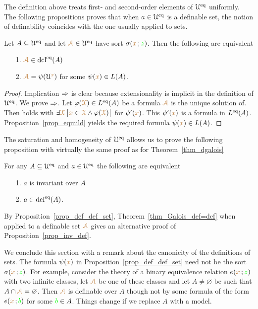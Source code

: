 The definition above treats first- and second-order elements of $\EuScript U^{{\rm eq}}$ uniformly.
The following propositions proves that when $a\in\EuScript U^{{\rm eq}}$ is a definable set, the notion of definability coincides with the one usually applied to sets.

\begin{proposition}\label{prop_def_def_set}
Let $A\subseteq\EuScript U^{{\rm eq}}$ and let ${\color{brown}\EuScript A}\in\EuScript U^{{\rm eq}}$ have sort $\sigma({\color{brown} x}\,;{\color{green} z})$.
Then the following are equivalent
\begin{itemize}
\item[1.] ${\color{brown}\EuScript A}\in{\rm dcl}^{{\rm eq}}(A)$
\item[2.] ${\color{brown}\EuScript A}=\psi(\EuScript U^{\color{brown} x})$ for some $\psi({\color{brown} x})\in L(A)$.
\end{itemize}
\end{proposition}

\begin{proof}
Implication $\Rightarrow$ is clear because extensionality is implicit in the definition of $\EuScript U^{{\rm eq}}$.
We prove $\Rightarrow$.
Let $\varphi({\color{brown}\EuScript X})\in L^{{\rm eq}}(A)$ be a formula ${\color{brown}\EuScript A}$ is the unique solution of.
Then  holds with $\exists {\color{brown}\EuScript X}\,\big[{\color{brown} x}\in {\color{brown}\EuScript X}\wedge\varphi({\color{brown}\EuScript X})\big]$ for $\psi'({\color{brown} x})$. This $\psi'({\color{brown} x})$ is a formula in $L^{{\rm eq}}(A)$. Proposition~\ref{prop_eqmild} yields the required formula $\psi({\color{brown} x})\in L(A)$.
\end{proof}

The saturation and homogeneity of $\EuScript U^{{\rm eq}}$ allows us to prove the following proposition with virtually the same proof as for Theorem~\ref{thm_dgalois}

\begin{theorem}\label{thm_Galois_def=def}
For any $A\subseteq\EuScript U^{{\rm eq}}$ and $a\in\EuScript U^{{\rm eq}}$ the following are equivalent
\begin{itemize}
\item[1.] $a$ is invariant over $A$
\item[2.] $a\in{\rm dcl}^{{\rm eq}}(A)$.
\end{itemize}
\end{theorem}

By Proposition~\ref{prop_def_def_set}, Theorem~\ref{thm_Galois_def=def} when applied to a definable set ${\color{brown}\EuScript A}$ gives an alternative proof of Proposition~\ref{prop_inv_def}.

We conclude this section with a remark about the canonicity of the definitions of sets.
The formula $\psi({\color{brown} x})$ in Proposition~\ref{prop_def_def_set} need not be the sort $\sigma({\color{brown} x}\,;{\color{green} z})$.
For example, consider the theory of a binary equivalence relation $e({\color{brown} x}\,;{\color{green} z})$ with two infinite classes, let ${\color{brown}\EuScript A}$ be one of these classes and let $A\neq\varnothing$ be such that $A\cap {\color{brown}\EuScript A}=\varnothing$.
Then ${\color{brown}\EuScript A}$ is definable over $A$ though not by some formula of the form $e({\color{brown} x}\,;{\color{green} b})$ for some ${\color{green} b}\in A$.
Things change if we replace $A$ with a model.

